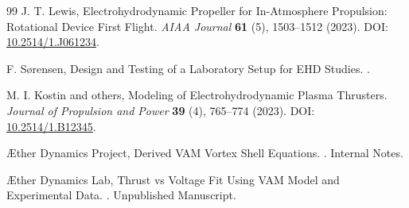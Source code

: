 \documentclass[a4paper,12pt]{article}
\begin{document}
\begin{thebibliography}{99}
J. T. Lewis,
\newblock Electrohydrodynamic Propeller for In-Atmosphere Propulsion: Rotational Device First Flight.
\textit{AIAA Journal} \textbf{61} (5), 1503--1512 (2023).
\newblock DOI: \href{https://doi.org/10.2514/1.J061234}{10.2514/1.J061234}.


F. Sørensen,
\newblock Design and Testing of a Laboratory Setup for EHD Studies.
.


M. I. Kostin and others,
\newblock Modeling of Electrohydrodynamic Plasma Thrusters.
\textit{Journal of Propulsion and Power} \textbf{39} (4), 765--774 (2023).
\newblock DOI: \href{https://doi.org/10.2514/1.B12345}{10.2514/1.B12345}.


Æther Dynamics Project,
\newblock Derived VAM Vortex Shell Equations.
.
\newblock Internal Notes.


Æther Dynamics Lab,
\newblock Thrust vs Voltage Fit Using VAM Model and Experimental Data.
.
\newblock Unpublished Manuscript.


\end{thebibliography}
\end{document}
